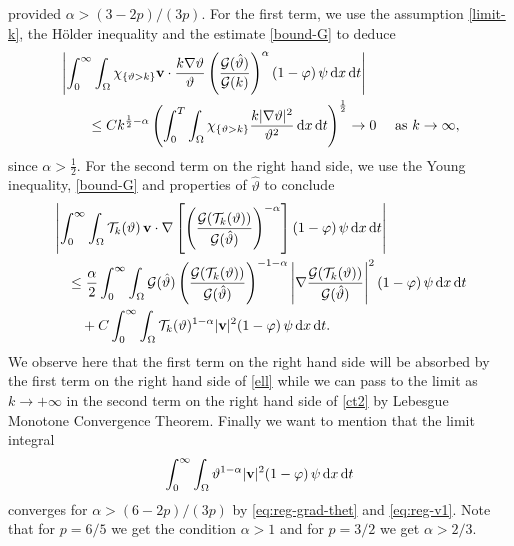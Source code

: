 \documentclass[11pt, a4paper, reqno]{amsart}
\numberwithin{equation}{section}
\newcommand{\thetah}{\hat\thet}
\newcommand{\vc}[1]{{\bf #1}}
\newcommand{\vv}{\vc{v}}
\newcommand{\thet}{\vartheta}
\newcommand{\D}{\mathbf{D}}
\newcommand{\dt}{\,{\rm d} t }
\newcommand{\dx}{\,{\rm d} {x}}
\newcommand{\dxdt}{\dx  \dt}
\newcommand{\G}{\mathcal{G}}
\newcommand{\al}{\alpha}
\newcommand{\intnO}[1]{\int_0^{\infty}\intO{ #1 }\dt}
\newcommand{\intO}[1]{\int_{\Omega} #1 \dx}
\newcommand{\intTO}[1]{\int_0^T \int_{\Omega} #1  \dxdt}
\newcommand{\tmax}{\overline{\thet}}
\begin{document}
provided $\alpha>(3-2p)/(3p)$.
For the first term, we use the assumption \eqref{limit-k}, the H\"{o}lder inequality and the estimate \eqref{bound-G} to deduce
\begin{equation*}
\begin{split}
&\left|\intnO{\chi_{\{\thet>k\}}\vv \cdot \frac{k \nabla \thet}{\thet} \left(\frac{\G(\thetah)}{\G(k)}\right)^{\al}  (1-\varphi)\,\psi }\right| \\
&\qquad \le Ck^{\frac12 - \alpha}\left(\intTO{\chi_{\{\thet>k\}}\frac{k |\nabla \thet|^2}{\thet^2}}
\right)^{\frac{1}{2}} \to 0 \quad \textrm{ as } k\to\infty,
\end{split}
\end{equation*}
since $\al>\frac12$. For the second term on the right hand side, we use the Young inequality, \eqref{bound-G} and properties of $\thetah$ to conclude
\begin{equation}\label{ct2}
\begin{split}
&\left|\intnO{\mathcal{T}_k(\thet)\,\vv  \cdot \nabla\left[\left(\frac{\G(\mathcal{T}_k(\thet))}{\G(\thetah)}\right)^{-\al}\right](1-\varphi)\,\psi}\right|\\
&\quad \le \frac{\alpha}{2}\intnO{\mathcal{G}(\thetah)\left(\frac{\G(\mathcal{T}_k(\thet))}{\G(\thetah)}\right)^{-1-\al}\left|\nabla\frac{\G(\mathcal{T}_k(\thet))}{\G(\thetah)}
\right|^2 (1-\varphi)\,\psi}\\
&\qquad +C\intnO{\mathcal{T}_k(\thet)^{1-\al}|\vv|^2 (1-\varphi)\,\psi}.
\end{split}
\end{equation}
We observe here that the first term on the right hand side will be absorbed by the first term on the right hand side of \eqref{ell} while we can pass to the limit as $k\to+\infty$ in the second term on the right hand side of \eqref{ct2} by Lebesgue Monotone Convergence Theorem. Finally we want to mention that the limit integral
$$
\intnO{{\thet^{1-\al}|\vv|^2(1-\varphi)\,\psi}}
$$
converges for $\alpha>(6-2p)/(3p)$ by \eqref{eq:reg-grad-thet} and \eqref{eq:reg-v1}. Note that for $p=6/5$ we get the condition $\alpha>1$ and for $p=3/2$ we get $\alpha>2/3$.
\end{document}
